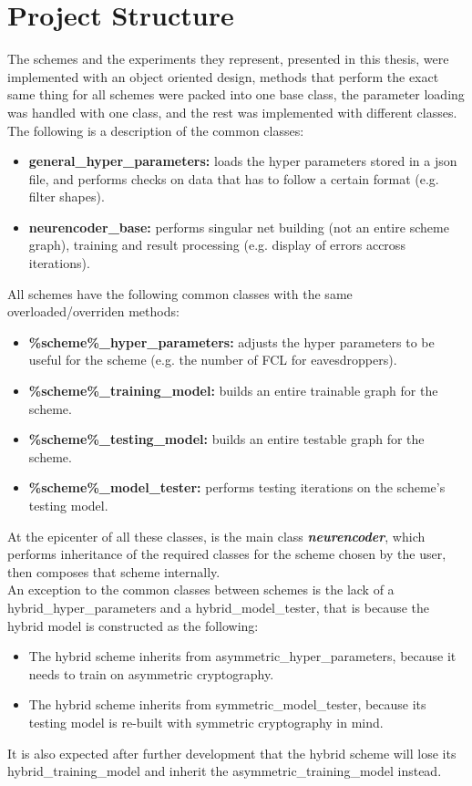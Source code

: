 \documentclass[a4paper, 12pt]{report}
\begin{document}
\section{\textbf{Project Structure}}
The schemes and the experiments they represent, presented in this thesis, were implemented with an object oriented design, methods that perform the exact same thing for all schemes were packed into one base class, the parameter loading was handled with one class, and the rest was implemented with different classes.\\
The following is a description of the common classes:\\
\begin{itemize}
	\item \textbf{general\_hyper\_parameters:} loads the hyper parameters stored in a json file, and performs checks on data that has to follow a certain format (e.g. filter shapes).
	\item \textbf{neurencoder\_base:} performs singular net building (not an entire scheme graph), training and result processing (e.g. display of errors accross iterations).
\end{itemize}
All schemes have the following common classes with the same overloaded/overriden methods:
\begin{itemize}
	\item \textbf{\%scheme\%\_hyper\_parameters:} adjusts the hyper parameters to be useful for the scheme (e.g. the number of FCL for eavesdroppers).
	\item \textbf{\%scheme\%\_training\_model:} builds an entire trainable graph for the scheme.
	\item \textbf{\%scheme\%\_testing\_model:} builds an entire testable graph for the scheme.
	\item \textbf{\%scheme\%\_model\_tester:} performs testing iterations on the scheme's testing model.
\end{itemize}
At the epicenter of all these classes, is the main class \textbf{\textit{neurencoder}}, which performs inheritance of the required classes for the scheme chosen by the user, then composes that scheme internally.\\
An exception to the common classes between schemes is the lack of a hybrid\_hyper\_parameters and a hybrid\_model\_tester, that is because the hybrid model is constructed as the following:
\begin{itemize}
	\item The hybrid scheme inherits from asymmetric\_hyper\_parameters, because it needs to train on asymmetric cryptography.
	\item The hybrid scheme inherits from symmetric\_model\_tester, because its testing model is re-built with symmetric cryptography in mind.
\end{itemize}
It is also expected after further development that the hybrid scheme will lose its hybrid\_training\_model and inherit the asymmetric\_training\_model instead.
\end{document}
